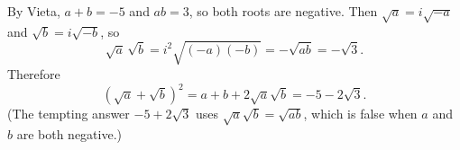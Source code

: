 By Vieta, $a+b=-5$ and $ab=3$, so both roots are negative. Then $\sqrt a=i\sqrt{-a}$ and $\sqrt b=i\sqrt{-b}$, so
\[\sqrt a\,\sqrt b=i^2\sqrt{(-a)(-b)}=-\sqrt{ab}=-\sqrt3.\]
Therefore
\[\left(\sqrt a+\sqrt b\right)^2=a+b+2\sqrt a\sqrt b=\boxed{-5-2\sqrt3}.\]
(The tempting answer $-5+2\sqrt3$ uses $\sqrt a\sqrt b=\sqrt{ab}$, which is false when $a$ and $b$ are both negative.)
